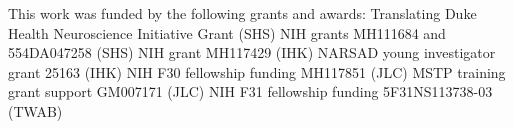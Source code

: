 
This work was funded by the following grants and awards:
Translating Duke Health Neuroscience Initiative Grant (SHS)
NIH grants MH111684 and 554DA047258 (SHS)
NIH grant MH117429 (IHK)
NARSAD young investigator grant 25163 (IHK)
NIH F30 fellowship funding MH117851 (JLC)
MSTP training grant support GM007171 (JLC)
NIH F31 fellowship funding 5F31NS113738-03 (TWAB)
